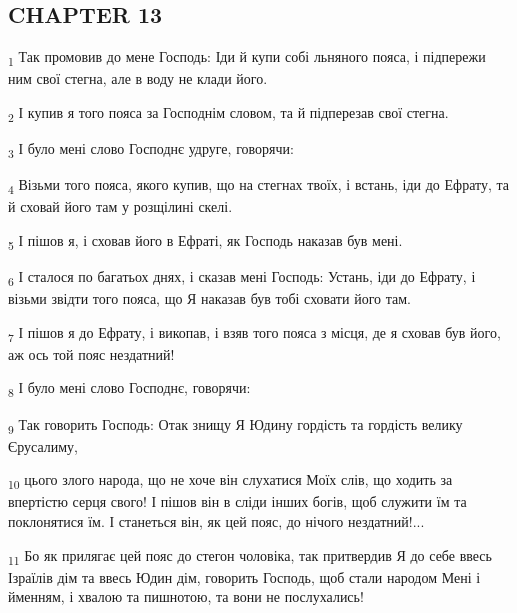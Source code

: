 \subsection{CHAPTER 13}
\begin{tcolorbox}
\textsubscript{1} Так промовив до мене Господь: Іди й купи собі льняного пояса, і підпережи ним свої стегна, але в воду не клади його.
\end{tcolorbox}
\begin{tcolorbox}
\textsubscript{2} І купив я того пояса за Господнім словом, та й підперезав свої стегна.
\end{tcolorbox}
\begin{tcolorbox}
\textsubscript{3} І було мені слово Господнє удруге, говорячи:
\end{tcolorbox}
\begin{tcolorbox}
\textsubscript{4} Візьми того пояса, якого купив, що на стегнах твоїх, і встань, іди до Ефрату, та й сховай його там у розщілині скелі.
\end{tcolorbox}
\begin{tcolorbox}
\textsubscript{5} І пішов я, і сховав його в Ефраті, як Господь наказав був мені.
\end{tcolorbox}
\begin{tcolorbox}
\textsubscript{6} І сталося по багатьох днях, і сказав мені Господь: Устань, іди до Ефрату, і візьми звідти того пояса, що Я наказав був тобі сховати його там.
\end{tcolorbox}
\begin{tcolorbox}
\textsubscript{7} І пішов я до Ефрату, і викопав, і взяв того пояса з місця, де я сховав був його, аж ось той пояс нездатний!
\end{tcolorbox}
\begin{tcolorbox}
\textsubscript{8} І було мені слово Господнє, говорячи:
\end{tcolorbox}
\begin{tcolorbox}
\textsubscript{9} Так говорить Господь: Отак знищу Я Юдину гордість та гордість велику Єрусалиму,
\end{tcolorbox}
\begin{tcolorbox}
\textsubscript{10} цього злого народа, що не хоче він слухатися Моїх слів, що ходить за впертістю серця свого! І пішов він в сліди інших богів, щоб служити їм та поклонятися їм. І станеться він, як цей пояс, до нічого нездатний!...
\end{tcolorbox}
\begin{tcolorbox}
\textsubscript{11} Бо як прилягає цей пояс до стегон чоловіка, так притвердив Я до себе ввесь Ізраїлів дім та ввесь Юдин дім, говорить Господь, щоб стали народом Мені і йменням, і хвалою та пишнотою, та вони не послухались!
\end{tcolorbox}
